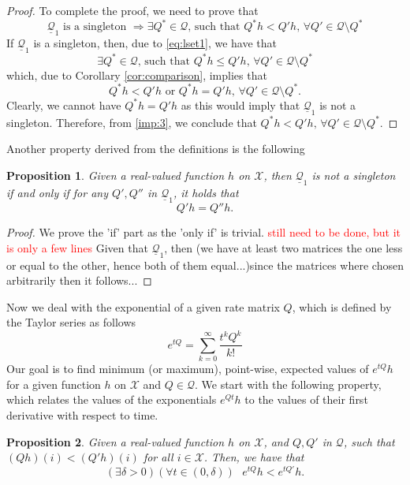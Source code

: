 \documentclass{article}
\newcommand{\statessymbol}{\mathcal{X}}
\newcommand{\matrices}{\mathcal{Q}}
\newcommand{\lmatrixi}[1]{\underline{\matrices}_{#1}}
\newcommand{\stateset}{\statessymbol}
\newcommand{\de}{\delta}
\newtheorem{Proposition}{Proposition}
\begin{document}
\begin{proof}
\noindent
To complete the proof, we need to prove that
\begin{equation*} 
\lmatrixi{1}\text{ is a singleton }\Rightarrow \exists Q^{*}\in\matrices\text{, such that } Q^{*}h< Q'h\text{, }\forall Q ' \in\matrices\setminus Q^{*}
\end{equation*}
If $\lmatrixi{1}$ is a singleton, then, due to \eqref{eq:lset1}, we have that
\begin{equation*} 
\exists Q^{*}\in\matrices\text{, such that } Q^{*}h\leq Q'h\text{, }\forall Q ' \in\matrices\setminus Q^{*}
\end{equation*}
which, due to Corollary \ref{cor:comparison}, implies that
\begin{equation} \label{imp:3}
 Q^{*}h< Q'h \text{ or }  Q^{*}h= Q'h\text{, }\forall Q' \in\matrices\setminus Q^{*}. 
\end{equation}
Clearly, we cannot have $ Q^{*}h= Q'h$ as this would imply that $\lmatrixi{1}$ is not a singleton. 
Therefore, from \eqref{imp:3}, we conclude that $ Q^{*}h< Q'h \text{, }\forall Q' \in\matrices\setminus Q^{*}$.
\end{proof}

\noindent
Another property derived from the definitions is the following
\begin{Proposition} \label{prop:not_singleton}
Given a real-valued function $h$ on $\stateset$, then $\lmatrixi{1}$ is not a singleton if and only if for any $ Q', Q''$ in $\lmatrixi{1}$, it holds that 
\begin{equation*}
 Q'h= Q''h.
\end{equation*} 
\end{Proposition}
\begin{proof}
We prove the 'if' part as the 'only if' is trivial. 
\textcolor{red}{still need to be done, but it is only a few lines}
Given that $\lmatrixi{1}$, then (we have at least two matrices the one less or equal to the other, hence both of them equal...)since the matrices where chosen arbitrarily then it follows...
\end{proof}

Now we deal with the exponential of a given rate matrix $Q$, which is defined by the Taylor series as follows
\begin{equation}
e^{tQ}=\sum_{k=0}^{\infty}{\frac{t^{k}Q^{k}}{k!}}
\end{equation}
Our goal is to find minimum (or maximum), point-wise, expected values of $e^{tQ}h$ for a given function $h$ on $\stateset$ and $Q\in\matrices$.
We start with the following property, which relates the values of the exponentials $e^{Qt}h$ to the values of their first derivative with respect to time.
\begin{Proposition} \label{prop:exp_1}
Given a real-valued function $h$ on $\stateset$, and $ Q, Q'$ in $\matrices$, such that $ (Q h)(i)< (Q'h)(i)$ for all $i\in\stateset$.
Then, we have that
\begin{equation*}
(\exists\de>0)(\forall t\in(0,\de))\text{ }e^{t Q}h<e^{t Q'}h.
\end{equation*}
\end{Proposition}
\end{document}
